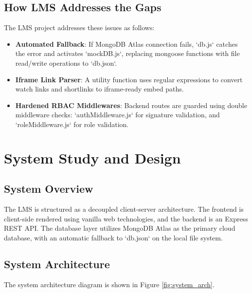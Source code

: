 \documentclass[12pt,a4paper]{report}
\begin{document}
\section{How LMS Addresses the Gaps}
The LMS project addresses these issues as follows:
\begin{itemize}
    \item \textbf{Automated Fallback}: If MongoDB Atlas connection fails, `db.js` catches the error and activates `mockDB.js`, replacing mongoose functions with file read/write operations to `db.json`.
    \item \textbf{Iframe Link Parser}: A utility function uses regular expressions to convert watch links and shortlinks to iframe-ready embed paths.
    \item \textbf{Hardened RBAC Middlewares}: Backend routes are guarded using double middleware checks: `authMiddleware.js` for signature validation, and `roleMiddleware.js` for role validation.
\end{itemize}

\chapter{System Study and Design}

\section{System Overview}
The LMS is structured as a decoupled client-server architecture. The frontend is client-side rendered using vanilla web technologies, and the backend is an Express REST API. The database layer utilizes MongoDB Atlas as the primary cloud database, with an automatic fallback to `db.json` on the local file system.

\section{System Architecture}

The system architecture diagram is shown in Figure \ref{fig:system_arch}.
\end{document}
